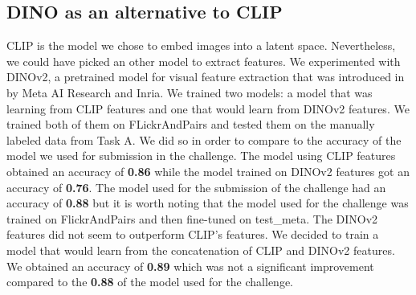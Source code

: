 \documentclass[12pt,a4paper]{article}
\begin{document}
\subsection{DINO as an alternative to CLIP}
CLIP is the model we chose to embed images into a latent space. Nevertheless, we could have picked an other model to extract features. We experimented with DINOv2, a pretrained model for visual feature extraction that was introduced in \autocite*{oquabDINOv2LearningRobust2024} by Meta AI Research and Inria. We trained two models: a model that was learning from CLIP features and one that would learn from DINOv2 features. We trained both of them on FLickrAndPairs and tested them on the manually labeled data from Task A. We did so in order to compare to the accuracy of the model we used for submission in the challenge. The model using CLIP features obtained an accuracy of \textbf{0.86} while the model trained on DINOv2 features got an accuracy of \textbf{0.76}. The model used for the submission of the challenge had an accuracy of \textbf{0.88} but it is worth noting that the model used for the challenge was trained on FlickrAndPairs and then fine-tuned on test\_meta. The DINOv2 features did not seem to outperform CLIP's features. We decided to train a model that would learn from the concatenation of CLIP and DINOv2 features. We obtained an accuracy of  \textbf{0.89} which was not a significant improvement compared to the \textbf{0.88} of the model used for the challenge.
\end{document}
